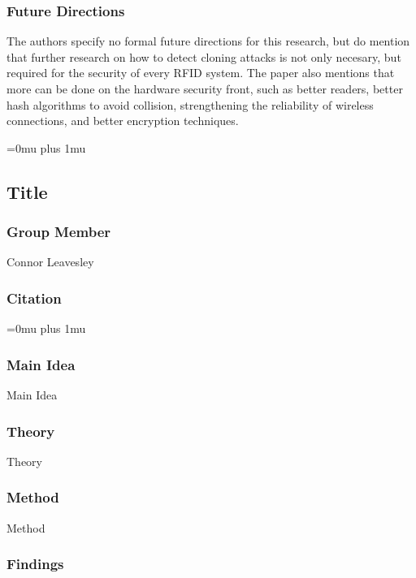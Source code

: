 \subsubsection{Future Directions}

\noindent
The authors specify no formal future directions for this research, but do mention that further research on how to detect cloning attacks is not only necesary, but required for the security of every RFID system.  The paper also mentions that more can be done on the hardware security front, such as better readers, better hash algorithms to avoid collision, strengthening the reliability of wireless connections, and better encryption techniques.

\Urlmuskip=0mu plus 1mu\relax

\noindent
\subsection{Title}

\subsubsection{Group Member}

\noindent
Connor Leavesley

\noindent
\subsubsection{Citation}

\Urlmuskip=0mu plus 1mu\relax

\subsubsection{Main Idea}

\noindent
Main Idea

\subsubsection{Theory}

\noindent
Theory

\subsubsection{Method}

\noindent
Method

\subsubsection{Findings}

